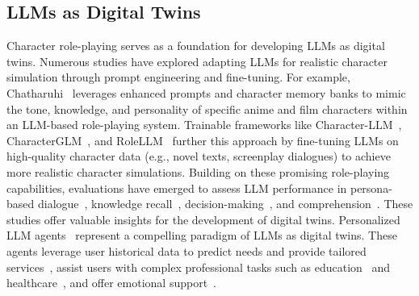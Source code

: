 \label{section_related_work}

\subsection{LLMs as Digital Twins}
Character role-playing serves as a foundation for developing LLMs as digital twins.  Numerous studies have explored adapting LLMs for realistic character simulation through prompt engineering and fine-tuning. For example, Chatharuhi~\cite{li2023chatharuhi} leverages enhanced prompts and character memory banks to mimic the tone, knowledge, and personality of specific anime and film characters within an LLM-based role-playing system.  Trainable frameworks like Character-LLM~\cite{shao2023characterllm}, CharacterGLM~\cite{zhou2023characterglm}, and RoleLLM~\cite{wang2024rolellm} further this approach by fine-tuning LLMs on high-quality character data (e.g., novel texts, screenplay dialogues) to achieve more realistic character simulations.  
Building on these promising role-playing capabilities, evaluations have emerged to assess LLM performance in persona-based dialogue~\cite{shen2024roleeval, wakaki2024comperdial, gao2023livechat}, knowledge recall~\cite{shen2024roleeval}, decision-making~\cite{xu2024character}, and comprehension~\cite{yuan2024evaluating}. 
These studies offer valuable insights for the development of digital twins.
Personalized LLM agents~\cite{li2024personal} represent a compelling paradigm of LLMs as digital twins. These agents leverage user historical data to predict needs and provide tailored services~\cite{tan2024personalized,zhuang2406hydra,zhang2024personalized}, assist users with complex professional tasks such as education~\cite{zhang2024simulating} and healthcare~\cite{abbasian2023conversational}, and offer emotional support~\cite{tu2023characterchat}.


